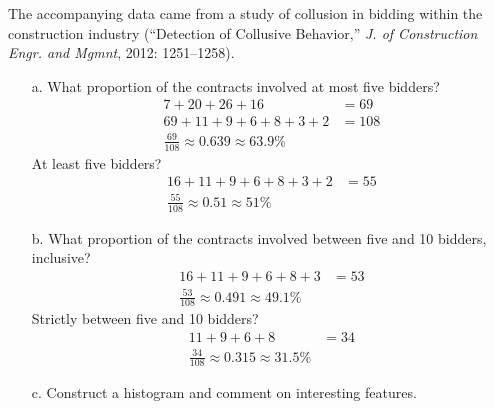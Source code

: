 \documentclass[letterpaper,12pt]{article}
\begin{document}
\begin{enumerate}
    The accompanying data came from a study of collusion in bidding within the construction industry (``Detection of Collusive Behavior,'' \textit{J. of Construction Engr. and Mgmnt}, 2012: 1251–1258).
    \begin{center}
      \pgfplotstabletypeset[
        assign column name/.style={/pgfplots/table/column name={\textbf{#1}}},
        every column/.append style={
          column type={S[]},
          string type,
        },
        row predicate/.code={
          \pgfmathtruncatemacro\maxrowindex{\pgfplotstablerows-1}
          \ifnum#1=\maxrowindex\relax
            \pgfplotstableuserowfalse
          \fi
        }
      ]{\datacontracts}
    \end{center}
    \begin{enumerate}
      \item[a.]
        What proportion of the contracts involved at most five bidders?
        \begin{align*}
          7 + 20 + 26 + 16 &= 69 \\
          69 + 11 + 9 + 6 + 8 + 3 + 2 &= 108 \\
          \frac{69}{108} \approx 0.639 \approx 63.9\%
        \end{align*}
        At least five bidders?
        \begin{align*}
          16 + 11 + 9 + 6 + 8 + 3 + 2 &= 55 \\
          \frac{55}{108} \approx 0.51 \approx 51\%
        \end{align*}
      \item[b.]
        What proportion of the contracts involved between five and 10 bidders, inclusive?
        \begin{align*}
          16 + 11 + 9 + 6 + 8 + 3 &= 53 \\
          \frac{53}{108} \approx 0.491 \approx 49.1\%
        \end{align*}
        Strictly between five and 10 bidders?
        \begin{align*}
           11 + 9 + 6 + 8  &= 34 \\
          \frac{34}{108} \approx 0.315 \approx 31.5\%
        \end{align*}
      \item[c.]
        Construct a histogram and comment on interesting features.

\end{enumerate}
\end{enumerate}
\end{document}
